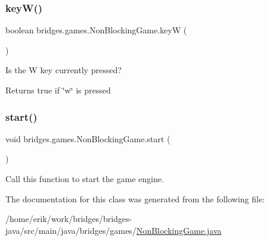 \subsubsection{\texorpdfstring{key\+W()}{keyW()}}
{\footnotesize\ttfamily boolean bridges.\+games.\+Non\+Blocking\+Game.\+keyW (\begin{DoxyParamCaption}{ }\end{DoxyParamCaption})\hspace{0.3cm}{\ttfamily [protected]}}



Is the W key currently pressed? 

\begin{DoxyReturn}{Returns}
true if \char`\"{}w\char`\"{} is pressed 
\end{DoxyReturn}
\mbox{\label{classbridges_1_1games_1_1_non_blocking_game_ac4df60691641278f139d138c7347674a}} 
\subsubsection{\texorpdfstring{start()}{start()}}
{\footnotesize\ttfamily void bridges.\+games.\+Non\+Blocking\+Game.\+start (\begin{DoxyParamCaption}{ }\end{DoxyParamCaption})}

Call this function to start the game engine. 

The documentation for this class was generated from the following file\+:\begin{DoxyCompactItemize}
\item 
/home/erik/work/bridges/bridges-\/java/src/main/java/bridges/games/\hyperlink{_non_blocking_game_8java}{Non\+Blocking\+Game.\+java}\end{DoxyCompactItemize}
